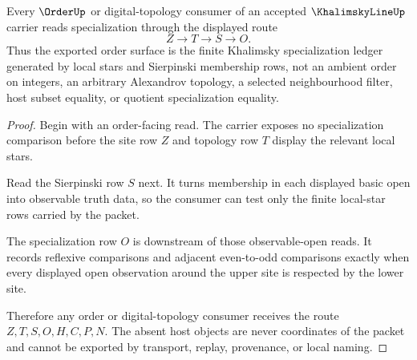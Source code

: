 \begin{theorem}
\label{thm:khalimsky-line-specialization-handoff}
Every $\OrderUp$ or digital-topology consumer of an accepted $\KhalimskyLineUp$ carrier reads specialization through the displayed route
$$
Z \longrightarrow T \longrightarrow S \longrightarrow O.
$$
Thus the exported order surface is the finite Khalimsky specialization ledger generated by local stars and Sierpinski membership rows, not an ambient order on integers, an arbitrary Alexandrov topology, a selected neighbourhood filter, host subset equality, or quotient specialization equality.
\end{theorem}
\begin{proof}
Begin with an order-facing read. The carrier exposes no specialization comparison before the site row $Z$ and topology row $T$ display the relevant local stars.

Read the Sierpinski row $S$ next. It turns membership in each displayed basic open into observable truth data, so the consumer can test only the finite local-star rows carried by the packet.

The specialization row $O$ is downstream of those observable-open reads. It records reflexive comparisons and adjacent even-to-odd comparisons exactly when every displayed open observation around the upper site is respected by the lower site.

Therefore any order or digital-topology consumer receives the route $Z,T,S,O,H,C,P,N$. The absent host objects are never coordinates of the packet and cannot be exported by transport, replay, provenance, or local naming.
\end{proof}


\begin{closurestatus}{\KhalimskyLineUp}
  \theoryclosure{\seedClosure}
  \formalstatus{\unformalizedV}
\end{closurestatus}
